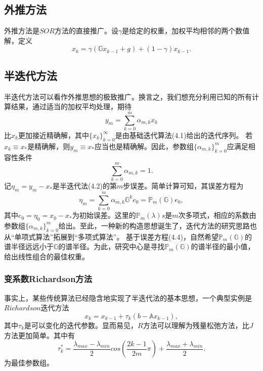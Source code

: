 \documentclass[10pt]{article}
\begin{document}
\subsection{外推方法}
\begin{definition}
外推方法是$SOR$方法的直接推广。设$\gamma$是给定的权重，加权平均相邻的两个数值解，定义
$$x_k=\gamma(\mathbb{G}x_{k-1}+g)+(1-\gamma)x_{k-1}.$$
\end{definition}
\subsection{半迭代方法}
半迭代方法可以看作外推思想的极致推广。换言之，我们想充分利用已知的所有计算结果，通过适当的加权平均处理，期待
\begin{equation}
y_m=\sum_{k=0}^m \alpha_{m,k}x_k
\end{equation}
比$x_k$更加接近精确解，其中$\lbrace x_k\rbrace_{k=0}^{\infty}$是由基础迭代算法(4.1)给出的迭代序列。
若$x_k\equiv x_{*}$是精确解，则$y_m\equiv x_{*}$应当也是精确解。因此，参数组$\lbrace \alpha_{m,k}\rbrace_{k=0}^{m}$应满足相容性条件
\begin{equation}
\sum_{k=0}^{m}\alpha_{m,k}=1.
\end{equation}
记$\eta_m=y_m-x_{*}$是半迭代法(4.2)的第$m$步误差。简单计算可知，其误差方程为
\begin{equation}
\eta_m=\sum_{k=0}^{m}\alpha_{m,k}\mathbb{G}^{k}e_0=\mathbb{P}_m(\mathbb{G})e_0,
\end{equation}
其中$e_0=\eta_0=x_0-x_{*}$为初始误差。这里的$\mathbb{P}_m(\lambda)s$是$m$次多项式，相应的系数由参数组$\lbrace\alpha_{m,k}\rbrace_{k=0}^m$给出。至此，一种新的构造思想诞生了，迭代方法的研究思路也从“单项式算法”拓展到“多项式算法”。\newline
基于误差方程(4.4)，自然希望$\mathbb{P}_m(\mathbb{G})$的谱半径远远小于$\mathbb{G}$的谱半径。为此，研究中心是寻找$\mathbb{P}_m(\mathbb{G})$的谱半径的最小值，给出线性组合的最佳权重。
\subsubsection{变系数Richardson方法}
事实上，某些传统算法已经隐含地实现了半迭代法的基本思想，一个典型实例是$Richardson$迭代方法
\begin{equation}
x_k=x_{k-1}+\tau_k(b-\mathbb{A}x_{k-1}),
\end{equation}其中$\tau_k$是可以变化的迭代参数。显而易见，$R$方法可以理解为残量松弛方法，比$J$方法更加简单。其中有
\begin{equation}
\tau_k^{*}=\frac{\lambda_{max}-\lambda_{min}}{2}cos(\frac{2k-1}{2m}\pi)+\frac{\lambda_{max}+\lambda_{min}}{2}.
\end{equation}为最佳参数组。
\end{document}
